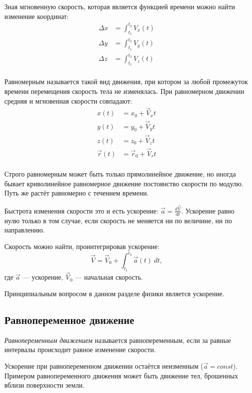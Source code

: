 Зная мгновенную скорость, которая является функцией времени можно найти
изменение координат:
\begin{align*}
  \Delta x & = \int_{t_1}^{t_2} V_x(t) \\
  \Delta y & = \int_{t_1}^{t_2} V_y(t) \\
  \Delta z & = \int_{t_1}^{t_2} V_z(t) \\
\end{align*}

Равномерным называется такой вид движения, при котором за любой промежуток
времени перемещения скорость тела не изменялась. При равномерном движении
средняя и мгновенная скорости совпадают:
\begin{align*}
  x(t)       & = x_0 + \vec{V}_x t       \\
  y(t)       & = y_0 + \vec{V}_y t       \\
  z(t)       & = z_0 + \vec{V}_z t       \\
  \vec{r}(t) & = \vec{r}_0 + \vec{V}_r t \\
\end{align*}

Строго равномерным может быть только прямолинейное движение, но иногда бывает
криволинейное равномерное движение постоянство скорости по модулю. Путь же
растёт равномерно с течением времени.

Быстрота изменения скорости это и есть ускорение: \( \vec{a} = \frac{d
\vec{V}}{d t} \). Ускорение равно нулю только в том случае, если скорость не
меняется ни по величине, ни по направлению.

Скорость можно найти, проинтегрировав ускорение:
\[
  \vec{V} = \vec{V}_0 + \int_{{t_1}}^{{t_2}} {\vec{a}(t)} \: d{t} {}
,\] где \( \vec{a} \) --- ускорение, \( \vec{V}_0 \) --- начальная скорость.

Принципиальным вопросом в данном разделе  физики является ускорение.

\subsection{Равнопеременное движение}

\emph{Равнопеременным движением} называется равнопеременным, если за равные
интервалы происходит равное изменение скорости.

Ускорение при равнопеременном движении остаётся неизменным  (\( \vec{a} = const
\)). Примером равнопеременного движения может быть движение тел, брошенных
вблизи поверхности земли.

